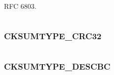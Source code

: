 \documentclass[letterpaper,10pt,english]{sphinxmanual}
\begin{document}
\begin{fulllineitems}
\label{appdev/refs/macros/CKSUMTYPE_CMAC_CAMELLIA256:CKSUMTYPE_CMAC_CAMELLIA256}
\end{fulllineitems}


RFC 6803.

\begin{tabulary}{\linewidth}{|L|L|}
\hline

 & 
\\
\hline\end{tabulary}



\subsubsection{CKSUMTYPE\_CRC32}
\label{appdev/refs/macros/CKSUMTYPE_CRC32:cksumtype-crc32-data}\label{appdev/refs/macros/CKSUMTYPE_CRC32::doc}\label{appdev/refs/macros/CKSUMTYPE_CRC32:cksumtype-crc32}

\begin{fulllineitems}
\label{appdev/refs/macros/CKSUMTYPE_CRC32:CKSUMTYPE_CRC32}
\end{fulllineitems}


\begin{tabulary}{\linewidth}{|L|L|}
\hline

 & 
\\
\hline\end{tabulary}



\subsubsection{CKSUMTYPE\_DESCBC}
\label{appdev/refs/macros/CKSUMTYPE_DESCBC:cksumtype-descbc-data}\label{appdev/refs/macros/CKSUMTYPE_DESCBC::doc}\label{appdev/refs/macros/CKSUMTYPE_DESCBC:cksumtype-descbc}

\begin{fulllineitems}
\label{appdev/refs/macros/CKSUMTYPE_DESCBC:CKSUMTYPE_DESCBC}
\end{fulllineitems}


\begin{tabulary}{\linewidth}{|L|L|}
\hline

 & 
\\
\hline\end{tabulary}
\end{document}
